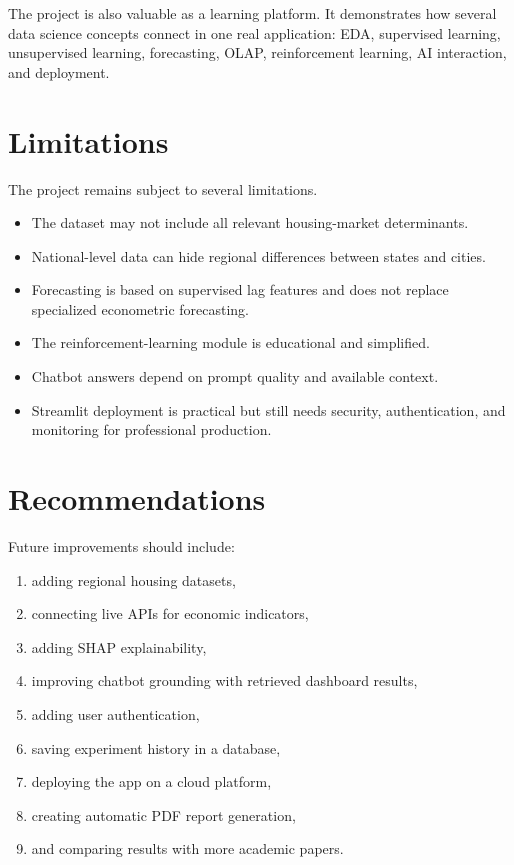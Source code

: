 The project is also valuable as a learning platform. It demonstrates how several data science concepts connect in one real application: EDA, supervised learning, unsupervised learning, forecasting, OLAP, reinforcement learning, AI interaction, and deployment.

\section{Limitations}

The project remains subject to several limitations.

\begin{itemize}
\item The dataset may not include all relevant housing-market determinants.
\item National-level data can hide regional differences between states and cities.
\item Forecasting is based on supervised lag features and does not replace specialized econometric forecasting.
\item The reinforcement-learning module is educational and simplified.
\item Chatbot answers depend on prompt quality and available context.
\item Streamlit deployment is practical but still needs security, authentication, and monitoring for professional production.
\end{itemize}

\section{Recommendations}

Future improvements should include:
\begin{enumerate}
\item adding regional housing datasets,
\item connecting live APIs for economic indicators,
\item adding SHAP explainability,
\item improving chatbot grounding with retrieved dashboard results,
\item adding user authentication,
\item saving experiment history in a database,
\item deploying the app on a cloud platform,
\item creating automatic PDF report generation,
\item and comparing results with more academic papers.
\end{enumerate}

